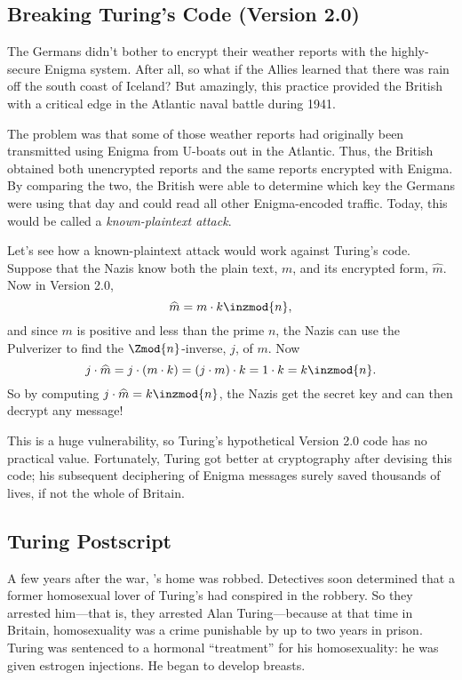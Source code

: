 \subsection{Breaking Turing's Code (Version 2.0)}

The Germans didn't bother to encrypt their weather reports with the
highly-secure Enigma system.  After all, so what if the Allies learned
that there was rain off the south coast of Iceland?  But amazingly,
this practice provided the British with a critical edge in the
Atlantic naval battle during 1941.

The problem was that some of those weather reports had originally been
transmitted using Enigma from U-boats out in the Atlantic.  Thus, the
British obtained both unencrypted reports and the same reports
encrypted with Enigma.  By comparing the two, the British were able to
determine which key the Germans were using that day and could read all
other Enigma-encoded traffic.  Today, this would be called a
\emph{known-plaintext attack}.

Let's see how a known-plaintext attack would work against Turing's
code.  Suppose that the Nazis know both the plain text, $m$, and its
encrypted form, $\widehat{m}$.  Now in Version 2.0,
\[
\widehat{m} = m \cdot k \inzmod{n},
\]
and since $m$ is positive and less than the prime $n$, the Nazis can
use the Pulverizer to find the $\Zmod{n}$-inverse, $j$, of $m$.  Now
\[
j \cdot \widehat{m} = j \cdot (m \cdot k) = (j \cdot m) \cdot k
= 1 \cdot k = k \inzmod{n}.
\]
So by computing $j \cdot \widehat{m} = k \inzmod{n}$, the Nazis get the
secret key and can then decrypt any message!

This is a huge vulnerability, so Turing's hypothetical Version 2.0
code has no practical value.  Fortunately, Turing got better at
cryptography after devising this code; his subsequent deciphering of
Enigma messages surely saved thousands of lives, if not the whole of
Britain.


\subsection{Turing Postscript}

A few years after the war, 's home was robbed.  Detectives soon
determined that a former homosexual lover of Turing's had conspired in
the robbery.  So they arrested him---that is, they arrested Alan
Turing---because at that time in Britain, homosexuality was a crime punishable by up
to two years in prison.  Turing was sentenced to a
hormonal ``treatment'' for his homosexuality: he was given estrogen
injections.  He began to develop breasts.

